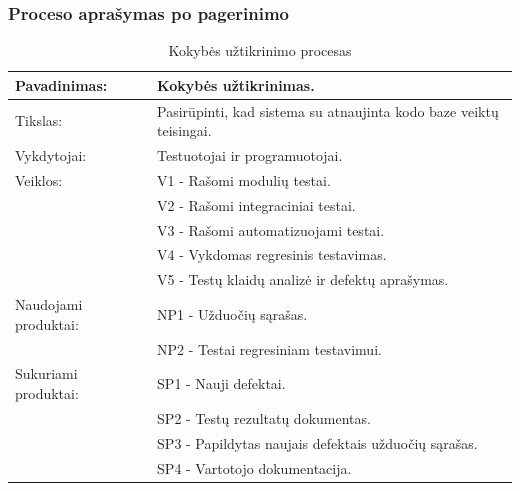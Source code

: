 \documentclass{VUMIFPSkursinis}
\begin{document}
	\subsubsection{Proceso aprašymas po pagerinimo}
	\begin{center}
		\begin{table}[ht]
			\caption{Kokybės užtikrinimo procesas}
			\begin{tabular}{ | l | l | }
				\hline
				Pavadinimas:		& Kokybės užtikrinimas.							\\ \hline
				Tikslas:		& Pasirūpinti, kad sistema su atnaujinta kodo baze veiktų teisingai.	\\ \hline
				Vykdytojai:		& Testuotojai ir programuotojai.					\\ \hline
				Veiklos:		& V1 - Rašomi modulių testai.						\\
							& V2 - Rašomi integraciniai testai.					\\
							& V3 - Rašomi automatizuojami testai.					\\
							& V4 - Vykdomas regresinis testavimas.					\\
							& V5 - Testų klaidų analizė ir defektų aprašymas.			\\ \hline
				Naudojami produktai:	& NP1 - Užduočių sąrašas. 						\\
							& NP2 - Testai regresiniam testavimui.					\\ \hline
				Sukuriami produktai:	& SP1 - Nauji defektai.							\\
							& SP2 - Testų rezultatų dokumentas.					\\
							& SP3 - Papildytas naujais defektais užduočių sąrašas.			\\ 
							& SP4 - Vartotojo dokumentacija. \\ \hline
			\end{tabular}
		\end{table}
	\end{center}
\end{document}

